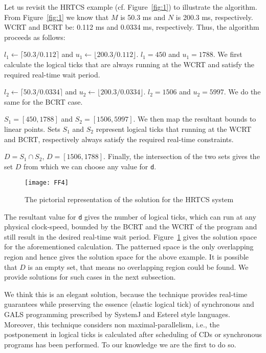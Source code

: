 Let us revisit the HRTCS example (cf. Figure~\ref{fig:1}) to illustrate
the algorithm. From Figure~\ref{fig:1} we know that $M$ is 50.3 ms and
$N$ is 200.3 ms, respectively.  WCRT and BCRT be: 0.112 ms and 0.0334 ms, respectively. Thus, the
algorithm proceeds as follows:

\begin{enumerate*}
\item $l_1 \leftarrow \lceil 50.3/0.112 \rceil$ and $u_1 \leftarrow
  \lfloor 200.3/0.112 \rfloor$. $l_1 = 450$ and $u_1 = 1788$. We first
  calculate the logical ticks that are always running at the WCRT and
  satisfy the required real-time wait period.
\item $l_2 \leftarrow \lceil 50.3/0.0334 \rceil$ and $u_2 \leftarrow
  \lfloor 200.3/0.0334 \rfloor$. $l_2 = 1506$ and $u_2 = 5997$. We do
  the same for the BCRT case.
\item $S_1 = [450,1788]$ and $S_2 =[1506,5997]$. We then map the
  resultant bounds to linear points. Sets $S_1$ and $S_2$ represent
  logical ticks that running at the WCRT and BCRT, respectively always
  satisfy the required real-time constraints.
\item $D = S_1 \cap S_2$, $D = [1506,1788]$. Finally, the intersection
  of the two sets gives the set $D$ from which we can choose any value
  for \texttt{d}.
\end{enumerate*}

\begin{figure}[t!]
  \centering
  \texttt{[image: FF4]}
  \caption{The pictorial representation of the solution for the HRTCS system}
  \label{fig:hrtcssoln}
\end{figure}

The resultant value for \texttt{d} gives the number of logical ticks,
which can run at any physical clock-speed, bounded by the BCRT and the
WCRT of the program and still result in the desired real-time wait
period. Figure~\ref{fig:hrtcssoln} gives the solution space for the
aforementioned calculation. The patterned space is the only overlapping
region and hence gives the solution space for the above example. It is
possible that $D$ is an empty set, that means no overlapping region
could be found. We provide solutions for such cases in the next
subsection.

We think this is an elegant solution, because the technique provides
real-time guarantees while preserving the essence (elastic logical tick)
of synchronous and GALS programming prescribed by SystemJ and Esterel
style languages. Moreover, this technique considers non
maximal-parallelism, i.e., the postponement in logical ticks is
calculated after scheduling of CDs or synchronous programs has been
performed. To our knowledge we are the first to do so.

